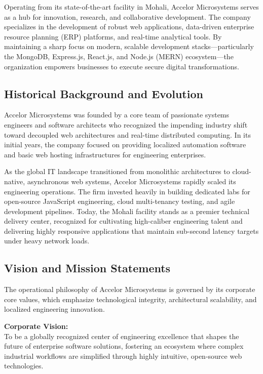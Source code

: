 \documentclass[12pt, a4paper, oneside]{report}
\begin{document}
Operating from its state-of-the-art facility in Mohali, Accelor Microsystems serves as a hub for innovation, research, and collaborative development. The company specializes in the development of robust web applications, data-driven enterprise resource planning (ERP) platforms, and real-time analytical tools. By maintaining a sharp focus on modern, scalable development stacks—particularly the MongoDB, Express.js, React.js, and Node.js (MERN) ecosystem—the organization empowers businesses to execute secure digital transformations.

\subsection{Historical Background and Evolution}

Accelor Microsystems was founded by a core team of passionate systems engineers and software architects who recognized the impending industry shift toward decoupled web architectures and real-time distributed computing. In its initial years, the company focused on providing localized automation software and basic web hosting infrastructures for engineering enterprises.

As the global IT landscape transitioned from monolithic architectures to cloud-native, asynchronous web systems, Accelor Microsystems rapidly scaled its engineering operations. The firm invested heavily in building dedicated labs for open-source JavaScript engineering, cloud multi-tenancy testing, and agile development pipelines. Today, the Mohali facility stands as a premier technical delivery center, recognized for cultivating high-caliber engineering talent and delivering highly responsive applications that maintain sub-second latency targets under heavy network loads.

\subsection{Vision and Mission Statements}

The operational philosophy of Accelor Microsystems is governed by its corporate core values, which emphasize technological integrity, architectural scalability, and localized engineering innovation.

\textbf{Corporate Vision:} \\
To be a globally recognized center of engineering excellence that shapes the future of enterprise software solutions, fostering an ecosystem where complex industrial workflows are simplified through highly intuitive, open-source web technologies.
\end{document}
